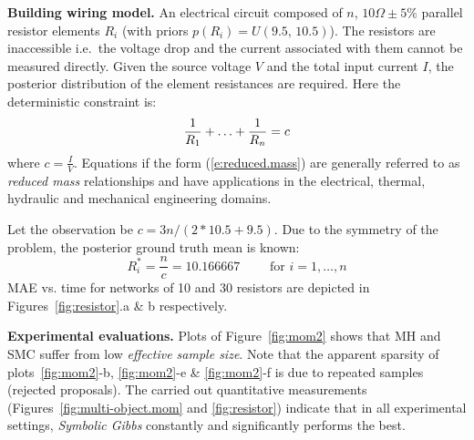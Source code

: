 \documentclass[letterpaper]{article}
\newcommand{\pr}{p}
\begin{document}
{\bf Building wiring model. } 
An electrical circuit composed of $n$, $10\Omega\pm5\%$ parallel resistor elements $R_i$
(with priors $\pr(R_i) = U(9.5, \, 10.5)$).
The resistors are inaccessible i.e.\ the voltage drop and the current associated with them cannot be measured directly.
Given the source voltage $V$ and the total input current $I$, the posterior distribution of the element resistances are required.
Here the deterministic constraint is:
\begin{equation} \footnotesize 
\label{e:reduced.mass}
 \frac{1}{R_1} + \ldots + \frac{1}{R_n} = c
\end{equation}
where $c = \frac{I}{V}$.
Equations if the form (\ref{e:reduced.mass}) are generally referred to as \emph{reduced mass} relationships and 
have applications in the electrical, thermal, hydraulic and mechanical engineering domains.

Let the observation be $c = {3n}/{(2*10.5 + 9.5)}$.
Due to the symmetry of the problem, the posterior ground truth mean is known:
\begin{equation*}
R_i^* = \frac{n}{c} = 10.166667\qquad \text{ for } i = 1, \ldots, n
\end{equation*}
MAE vs. time for networks of 10 and 30 resistors are depicted in 
Figures~\ref{fig:resistor}.a \& b respectively.

{\bf Experimental evaluations.}
Plots of Figure~\ref{fig:mom2} shows that MH and SMC suffer from low \emph{effective sample size}. 
Note that the apparent sparsity of plots~\ref{fig:mom2}-b, \ref{fig:mom2}-e \& \ref{fig:mom2}-f is due to repeated samples (rejected proposals).
%
The carried out quantitative measurements 
(Figures~\ref{fig:multi-object.mom} and \ref{fig:resistor}) 
indicate that in all experimental settings,
\emph{Symbolic Gibbs} constantly and significantly performs the best.
\end{document}
